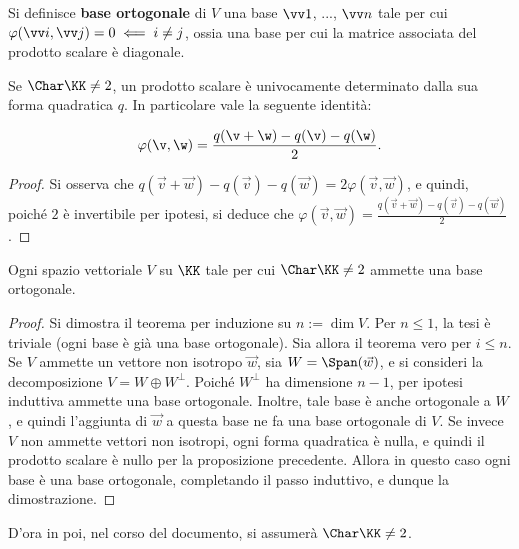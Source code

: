 \documentclass[11pt]{article}
\begin{document}
	\begin{definition}
		Si definisce \textbf{base ortogonale} di $V$ una base $\vv 1$, ..., $\vv n$ tale per cui $\varphi(\vv i, \vv j) = 0
		\impliedby i \neq j$, ossia una base per cui la matrice associata del prodotto scalare è diagonale. 
	\end{definition}

	\begin{proposition}
		Se $\Char \KK \neq 2$, un prodotto scalare è univocamente determinato dalla sua forma quadratica $q$.
		In particolare vale la seguente identità:
		
		\[ \varphi(\v, \w) = \frac{q(\v + \w) - q(\v) - q(\w)}{2}. \]
		
		\vskip 0.05in
	\end{proposition}

	\begin{proof}
		Si osserva che $q(\vec v + \vec w) - q(\vec v) - q(\vec w) = 2 \varphi(\vec v, \vec w)$, e quindi,
		poiché $2$ è invertibile per ipotesi, si deduce che $\varphi(\vec v, \vec w) = \frac{q(\vec v + \vec w) - q(\vec v) - q(\vec w)}{2}$.
	\end{proof}

	\begin{theorem}[di Lagrange]
		Ogni spazio vettoriale $V$ su $\KK$ tale per cui $\Char \KK \neq 2$ ammette una base ortogonale.
	\end{theorem}

	\begin{proof}
		Si dimostra il teorema per induzione su $n := \dim V$. Per $n \leq 1$, la tesi è triviale (ogni base è
		già una base ortogonale). Sia
		allora il teorema vero per $i \leq n$. Se $V$ ammette un vettore non isotropo $\vec w$, sia $W = \Span(\vec w)$, e si consideri la decomposizione $V = W \oplus W^\perp$. Poiché $W^\perp$ ha dimensione $n-1$, per ipotesi induttiva
		ammette una base ortogonale. Inoltre, tale base è anche ortogonale a $W$, e quindi l'aggiunta di $\vec w$ a
		questa base ne fa una base ortogonale di $V$. Se invece $V$ non ammette vettori non isotropi, ogni forma quadratica
		è nulla, e quindi il prodotto scalare è nullo per la proposizione precedente. Allora in questo caso
		ogni base è una base ortogonale, completando il passo induttivo, e dunque la dimostrazione.
	\end{proof}


	\begin{note}
		D'ora in poi, nel corso del documento, si assumerà $\Char \KK \neq 2$.
	\end{note}
\end{document}
